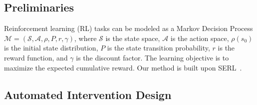 \documentclass[runningheads]{llncs}
\begin{document}
\subsection{Preliminaries}

Reinforcement learning (RL) tasks can be modeled as a Markov Decision Process $\mathcal{M} = \left(\mathcal{S}, \mathcal{A}, \rho, P, r, \gamma\right)$, where $\mathcal{S}$ is the state space, $\mathcal{A}$ is the action space, $\rho(s_0)$ is the initial state distribution, $P$ is the state transition probability, $r$ is the reward function, and $\gamma$ is the discount factor. The learning objective is to maximize the expected cumulative reward. Our method is built upon SERL~\cite{luo2024serl}.

\subsection{Automated Intervention Design}
\end{document}

